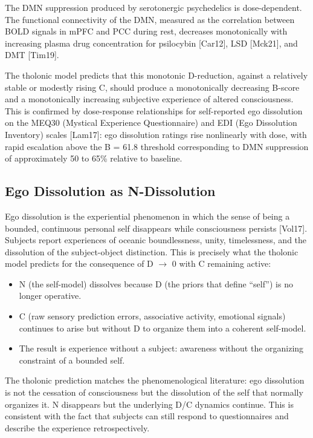 \documentclass[12pt]{article}
\providecommand{\tightlist}{%
  \setlength{\itemsep}{0pt}\setlength{\parskip}{0pt}}
\begin{document}
The DMN suppression produced by serotonergic psychedelics is
dose-dependent. The functional connectivity of the DMN, measured as the
correlation between BOLD signals in mPFC and PCC during rest, decreases
monotonically with increasing plasma drug concentration for psilocybin
{[}Car12{]}, LSD {[}Mck21{]}, and DMT {[}Tim19{]}.

The tholonic model predicts that this monotonic D-reduction, against a
relatively stable or modestly rising C, should produce a monotonically
decreasing B-score and a monotonically increasing subjective experience
of altered consciousness. This is confirmed by dose-response
relationships for self-reported ego dissolution on the MEQ30 (Mystical
Experience Questionnaire) and EDI (Ego Dissolution Inventory) scales
{[}Lam17{]}: ego dissolution ratings rise nonlinearly with dose, with
rapid escalation above the B = 61.8 threshold corresponding to DMN
suppression of approximately 50 to 65\% relative to baseline.

\subsection{Ego Dissolution as N-Dissolution}\label{ego-dissolution-as-n-dissolution}

Ego dissolution is the experiential phenomenon in which the sense of
being a bounded, continuous personal self disappears while consciousness
persists {[}Vol17{]}. Subjects report experiences of oceanic
boundlessness, unity, timelessness, and the dissolution of the
subject-object distinction. This is precisely what the tholonic model
predicts for the consequence of D \(\to\) 0 with C remaining active:

\begin{itemize}
\tightlist
\item
  N (the self-model) dissolves because D (the priors that define
  ``self'') is no longer operative.
\item
  C (raw sensory prediction errors, associative activity, emotional
  signals) continues to arise but without D to organize them into a
  coherent self-model.
\item
  The result is experience without a subject: awareness without the
  organizing constraint of a bounded self.
\end{itemize}

The tholonic prediction matches the phenomenological literature: ego
dissolution is not the cessation of consciousness but the dissolution of
the self that normally organizes it. N disappears but the underlying D/C
dynamics continue. This is consistent with the fact that subjects can
still respond to questionnaires and describe the experience
retrospectively.
\end{document}

